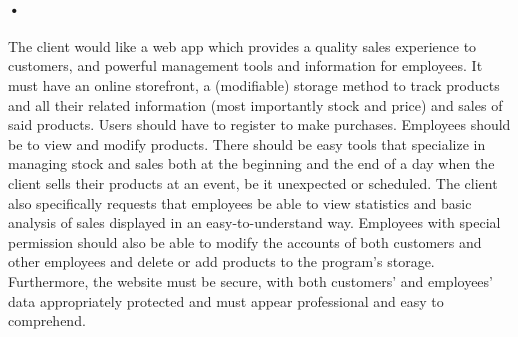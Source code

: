 \documentclass{article}
\begin{document}
    \paragraph{•}
    The client would like a web app which provides a quality sales experience to customers, and powerful management tools and information for employees. 
    It must have an online storefront, a (modifiable) storage method to track products and all their related information (most importantly stock and price) and sales of said products. 
    Users should have to register to make purchases. 
    Employees should be to view and modify products. 
    There should be easy tools that specialize in managing stock and sales both at the beginning and the end of a day when the client sells their products at an event, be it unexpected or scheduled. 
    The client also specifically requests that employees be able to view statistics and basic analysis of sales displayed in an easy-to-understand way. 
    Employees with special permission should also be able to modify the accounts of both customers and other employees and delete or add products to the program’s storage. 
    Furthermore, the website must be secure, with both customers’ and employees’ data appropriately protected and must appear professional and easy to comprehend.
    
\end{document}
